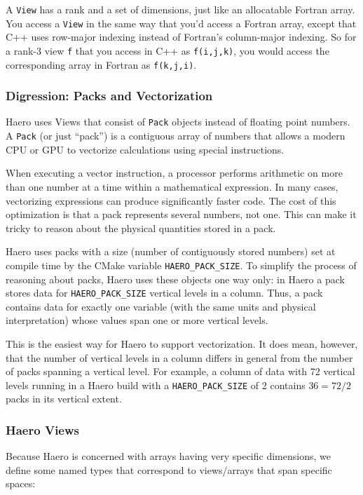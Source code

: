 A \texttt{View} has a rank and a set of dimensions, just like an allocatable
Fortran array. You access a \texttt{View} in the same way that you'd access a
Fortran array, except that C++ uses row-major indexing instead of Fortran's
column-major indexing. So for a rank-3 view \texttt{f} that you access in C++
as \texttt{f(i,j,k)}, you would access the corresponding array in Fortran as
\texttt{f(k,j,i)}.

\subsubsection*{Digression: Packs and Vectorization}

Haero uses Views that consist of \texttt{Pack} objects instead of floating
point numbers. A \texttt{Pack} (or just ``pack'') is a contiguous array of numbers
that allows a modern CPU or GPU to vectorize calculations using special
instructions.

When executing a vector instruction, a processor performs arithmetic on more
than one number at a time within a mathematical expression. In many cases,
vectorizing expressions can produce significantly faster code. The cost of this
optimization is that a pack represents several numbers, not one. This can make
it tricky to reason about the physical quantities stored in a pack.

Haero uses packs with a size (number of contiguously stored numbers) set at
compile time by the CMake variable \texttt{HAERO\_PACK\_SIZE}. To simplify the
process of reasoning about packs, Haero uses these objects one way only:
in Haero a pack stores data for \texttt{HAERO\_PACK\_SIZE} vertical levels in
a column. Thus, a pack contains data for exactly one variable (with the same
units and physical interpretation) whose values span one or more vertical
levels.

This is the easiest way for Haero to support vectorization. It does mean,
however, that the number of vertical levels in a column differs in general from
the number of packs spanning a vertical level. For example, a column of data
with 72 vertical levels running in a Haero build with a \texttt{HAERO\_PACK\_SIZE}
of 2 contains $36 = 72 / 2 $ packs in its vertical extent.

\subsubsection*{Haero Views}

Because Haero is concerned with arrays having very specific dimensions, we
define some named types that correspond to views/arrays that span specific
spaces:


